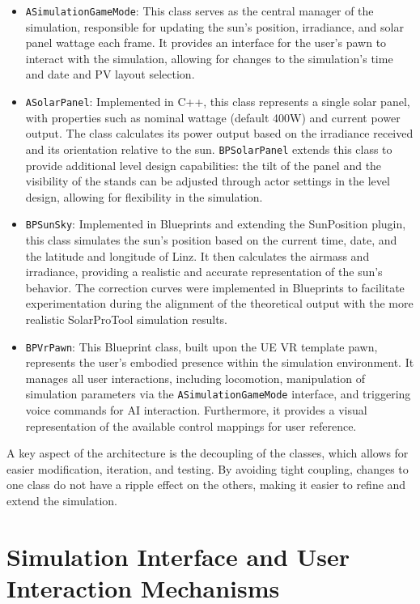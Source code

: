 \documentclass[draft, final]{vutinfth} %
\begin{document}
\begin{itemize}
    \item \lstinline|ASimulationGameMode|: This class serves as the central manager of the simulation, responsible for updating the sun's position, irradiance, and solar panel wattage each frame. It provides an interface for the user's pawn to interact with the simulation, allowing for changes to the simulation's time and date and PV layout selection.
    \item \lstinline|ASolarPanel|: Implemented in C++, this class represents a single solar panel, with properties such as nominal wattage (default 400W) and current power output. The class calculates its power output based on the irradiance received and its orientation relative to the sun. \lstinline|BPSolarPanel| extends this class to provide additional level design capabilities: the tilt of the panel and the visibility of the stands can be adjusted through actor settings in the level design, allowing for flexibility in the simulation.
    \item \lstinline|BPSunSky|: Implemented in Blueprints and extending the SunPosition plugin, this class simulates the sun's position based on the current time, date, and the latitude and longitude of Linz. It then calculates the airmass and irradiance, providing a realistic and accurate representation of the sun's behavior. The correction curves were implemented in Blueprints to facilitate experimentation during the alignment of the theoretical output with the more realistic SolarProTool simulation results.
    \item \lstinline|BPVrPawn|: This Blueprint class, built upon the UE VR template pawn, represents the user's embodied presence within the simulation environment. It manages all user interactions, including locomotion, manipulation of simulation parameters via the \lstinline|ASimulationGameMode| interface, and triggering voice commands for AI interaction.  Furthermore, it provides a visual representation of the available control mappings for user reference.
\end{itemize}

A key aspect of the architecture is the decoupling of the classes, which allows for easier modification, iteration, and testing. By avoiding tight coupling, changes to one class do not have a ripple effect on the others, making it easier to refine and extend the simulation.

\section{Simulation Interface and User Interaction Mechanisms}
\end{document}
